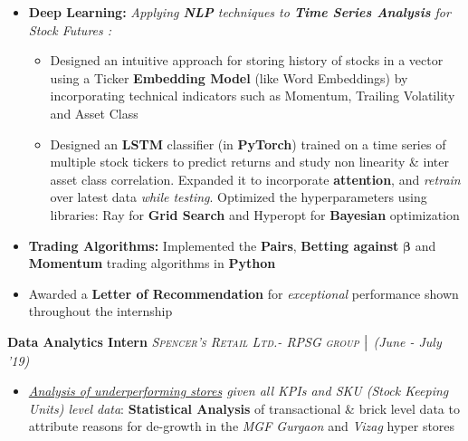 \documentclass{article}
\begin{document}
\begin{itemize}[itemsep = -1 mm, leftmargin=*]
    \item \textbf{Deep Learning: }{\it Applying \textbf{NLP} techniques to \textbf{Time Series Analysis} for Stock Futures :}
    \vspace{-7pt}
    \begin{itemize}[itemsep = -0.75 mm, leftmargin=*]
      \item Designed an intuitive approach for storing history of stocks in a vector using a Ticker \textbf{Embedding Model} (like Word Embeddings) by incorporating technical indicators such as Momentum, Trailing Volatility and Asset Class
     \item Designed an \textbf{LSTM} classifier (in \textbf{PyTorch}) trained on a time series of multiple stock tickers to predict returns and study non linearity \& inter asset class correlation. Expanded it to incorporate \textbf{attention}, and \textit{retrain} over latest data \textit{while testing}. Optimized the hyperparameters using libraries: Ray for \textbf{Grid Search} and Hyperopt for \textbf{Bayesian} optimization
    \end{itemize}
    \vspace{-4pt}
    \item \textbf{Trading Algorithms:} Implemented the \textbf{Pairs}, \textbf{Betting against} $\bm{\beta}$ and \textbf{Momentum} trading algorithms in \textbf{Python}
    \vspace{-1pt}
    \item Awarded a \textbf{Letter of Recommendation} for {\it exceptional} performance shown throughout the internship
\end{itemize}
\vspace{-5pt}
\textbf{Data Analytics Intern} \hfill{\sl \small \textsc{Spencer's Retail Ltd.- RPSG group} $\bigm|$ (June - July '19)}\\
\vspace{-19pt}
\begin{itemize}[itemsep = -1 mm, leftmargin=*]
    \item {\it \underline {Analysis of underperforming stores} given all KPIs and SKU (Stock Keeping Units) level data}: {\bf Statistical Analysis} of transactional \& brick level data to attribute reasons for de-growth in the {\it MGF Gurgaon} and {\it Vizag} hyper stores
\end{itemize}
\vspace{-5pt}
\end{document}
